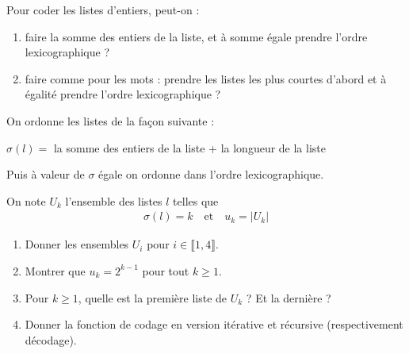 \documentclass[french,a4paper,10pt]{article}
\begin{document}
	\begin{td-exo}[]
		Pour coder les listes d'entiers, peut-on : 
			\begin{enumerate}
				\item faire la somme des entiers de la liste, et à somme égale prendre l'ordre lexicographique ?
				
				\item faire comme pour les mots : prendre les listes les plus courtes d'abord et à égalité prendre l'ordre lexicographique ?
			\end{enumerate}
		
	\end{td-exo}

	\begin{td-exo}[]
		On ordonne les listes de la façon suivante :
		\begin{center}
			$\sigma(l)=$ la somme des entiers de la liste + la longueur de la liste
		\end{center}
		
		Puis à valeur de $\sigma$ égale on ordonne dans l'ordre lexicographique.
		
		On note $U_k$ l'ensemble des listes $l$ telles que
			\[\begin{aligned}
				\sigma(l)=k\quad\text{et}\quad u_k=|U_k|
			\end{aligned}\]
			
		\begin{enumerate}
			\item Donner les ensembles $U_i$ pour $i\in\llbracket1,4\rrbracket$.
			
			\item Montrer que $u_k=2^{k-1}$ pour tout $k\ge1$.
			
			\item Pour $k\ge 1$, quelle est la première liste de $U_k$ ? Et la dernière ?
			
			\item Donner la fonction de codage en version itérative et récursive (respectivement décodage).
		\end{enumerate}
		
	\end{td-exo}
	
\end{document}
